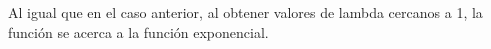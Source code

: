\begin{itemize}
\begin{itemize}
                Al igual que en el caso anterior, al obtener valores de lambda cercanos a
1, la funci\'on se acerca a la funci\'on exponencial.\\


	\end{itemize}
\end{itemize}
